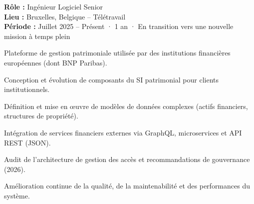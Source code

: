 \begin{cvgroup}

\begin{cvmetadata}
\textbf{Rôle :} Ingénieur Logiciel Senior \\
\textbf{Lieu :} Bruxelles, Belgique – Télétravail \\
\textbf{Période :} Juillet 2025 – Présent · 1 an · En transition vers une nouvelle mission à temps plein
\end{cvmetadata}

\begin{cvprojectsummary}
Plateforme de gestion patrimoniale utilisée par des institutions financières européennes (dont BNP Paribas).
\end{cvprojectsummary}


\begin{cvdetailmissions}
  \item {Conception et évolution de composants du SI patrimonial pour clients institutionnels.}
  \item {Définition et mise en œuvre de modèles de données complexes (actifs financiers, structures de propriété).}
  \item {Intégration de services financiers externes via GraphQL, microservices et API REST (JSON).}
  \item {Audit de l'architecture de gestion des accès et recommandations de gouvernance (2026).}
  \item {Amélioration continue de la qualité, de la maintenabilité et des performances du système.}
\end{cvdetailmissions}

\end{cvgroup}

